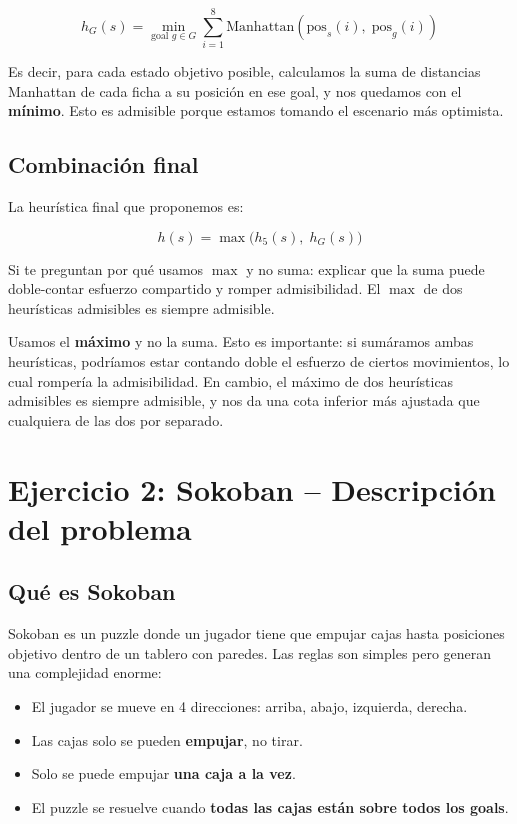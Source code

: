 \documentclass[12pt, a4paper]{article}
\begin{document}
$$h_G(s) = \min_{\text{goal } g \in G} \sum_{i=1}^{8} \text{Manhattan}(\text{pos}_s(i),\; \text{pos}_g(i))$$

Es decir, para cada estado objetivo posible, calculamos la suma de distancias Manhattan de cada ficha a su posición en ese goal, y nos quedamos con el \textbf{mínimo}. Esto es admisible porque estamos tomando el escenario más optimista.

\subsection{Combinación final}

La heurística final que proponemos es:

$$h(s) = \max\big(h_5(s),\; h_G(s)\big)$$

\begin{notapresentador}
Si te preguntan por qué usamos $\max$ y no suma: explicar que la suma puede doble-contar esfuerzo compartido y romper admisibilidad. El $\max$ de dos heurísticas admisibles es siempre admisible.
\end{notapresentador}

Usamos el \textbf{máximo} y no la suma. Esto es importante: si sumáramos ambas heurísticas, podríamos estar contando doble el esfuerzo de ciertos movimientos, lo cual rompería la admisibilidad. En cambio, el máximo de dos heurísticas admisibles es siempre admisible, y nos da una cota inferior más ajustada que cualquiera de las dos por separado.

\section{Ejercicio 2: Sokoban -- Descripción del problema}

\subsection{Qué es Sokoban}

Sokoban es un puzzle donde un jugador tiene que empujar cajas hasta posiciones objetivo dentro de un tablero con paredes. Las reglas son simples pero generan una complejidad enorme:

\begin{itemize}
  \item El jugador se mueve en 4 direcciones: arriba, abajo, izquierda, derecha.
  \item Las cajas solo se pueden \textbf{empujar}, no tirar.
  \item Solo se puede empujar \textbf{una caja a la vez}.
  \item El puzzle se resuelve cuando \textbf{todas las cajas están sobre todos los goals}.
\end{itemize}
\end{document}
